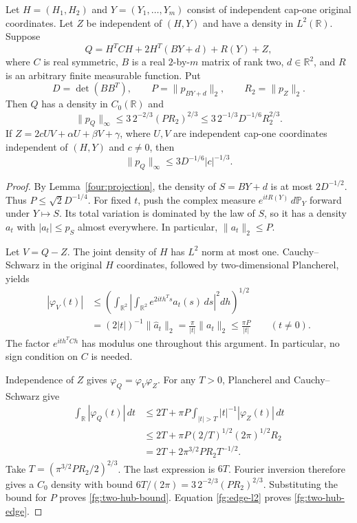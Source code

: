 \begin{theorem}
\label{fg:two-hub}
Let $H=(H_1,H_2)$ and $Y=(Y_1,\ldots,Y_m)$ consist of independent
cap-one original coordinates.  Let $Z$ be independent of $(H,Y)$
and have a density in $L^2(\mathbb R)$.  Suppose
\[
 Q=H^TCH+2H^T(BY+d)+R(Y)+Z,
\]
where $C$ is real symmetric, $B$ is a real $2$-by-$m$ matrix
of rank two, $d\in\mathbb R^2$, and $R$ is an arbitrary finite
measurable function.  Put
\[
 D=\det(BB^T),\qquad P=\|p_{BY+d}\|_2,\qquad R_2=\|p_Z\|_2 .
\]
Then $Q$ has a density in $C_0(\mathbb R)$ and
\begin{equation}\label{fg:two-hub-bound}
 \|p_Q\|_\infty
 \leq3\,2^{-2/3}(PR_2)^{2/3}
 \leq3\,2^{-1/3}D^{-1/6}R_2^{2/3}.
\end{equation}
If $Z=2cUV+\alpha U+\beta V+\gamma$, where $U,V$ are
independent cap-one coordinates independent of $(H,Y)$ and
$c\ne0$, then
\begin{equation}\label{fg:two-hub-edge}
 \|p_Q\|_\infty\leq3D^{-1/6}|c|^{-1/3}.
\end{equation}
\end{theorem}

\begin{proof}
By Lemma~\ref{four:projection}, the density of $S=BY+d$ is at
most $2D^{-1/2}$.  Thus $P\leq\sqrt2 D^{-1/4}$.
For fixed $t$, push the complex measure
$e^{itR(Y)}\,d\mathbb P_Y$ forward under $Y\mapsto S$.
Its total variation is dominated by the law of $S$, so it has
a density $a_t$ with $|a_t|\leq p_S$ almost everywhere.
In particular, $\|a_t\|_2\leq P$.

Let $V=Q-Z$.  The joint density of $H$ has $L^2$ norm at most
one.  Cauchy--Schwarz in the original $H$ coordinates,
followed by two-dimensional Plancherel, yields
\begin{align*}
 |\varphi_V(t)|
 &\leq
 \left(\int_{\mathbb R^2}
       \left|\int_{\mathbb R^2}e^{2it h^Ts}a_t(s)\,ds\right|^2
       dh\right)^{1/2}\\
 &=(2|t|)^{-1}\|\widehat a_t\|_2
   =\frac{\pi}{|t|}\|a_t\|_2
   \leq\frac{\pi P}{|t|}\qquad(t\ne0).
\end{align*}
The factor $e^{it h^TCh}$ has modulus one throughout this
argument.  In particular, no sign condition on $C$ is needed.

Independence of $Z$ gives
$\varphi_Q=\varphi_V\varphi_Z$.  For any $T>0$, Plancherel
and Cauchy--Schwarz give
\begin{align*}
 \int_{\mathbb R}|\varphi_Q(t)|\,dt
 &\leq2T+\pi P
       \int_{|t|>T}|t|^{-1}|\varphi_Z(t)|\,dt\\
 &\leq2T+
       \pi P(2/T)^{1/2}(2\pi)^{1/2}R_2\\
 &=2T+2\pi^{3/2}PR_2T^{-1/2}.
\end{align*}
Take $T=(\pi^{3/2}PR_2/2)^{2/3}$.  The last expression is $6T$.
Fourier inversion therefore gives a $C_0$ density with bound
$6T/(2\pi)=3\,2^{-2/3}(PR_2)^{2/3}$.
Substituting the bound for $P$ proves \eqref{fg:two-hub-bound}.
Equation \eqref{fg:edge-l2} proves \eqref{fg:two-hub-edge}.
\end{proof}

